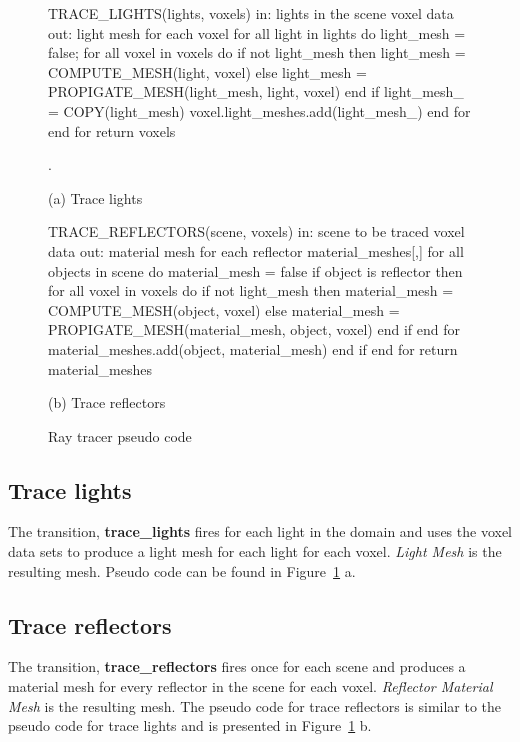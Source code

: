 \begin{figure}[!htb]
\begin{algorithm}
TRACE_LIGHTS(lights, voxels) 
  in:  lights in the scene
       voxel data
  out: light mesh for each voxel
  for all light in lights do
    light_mesh = false;
    for all voxel in voxels do 
      if not light_mesh then
        light_mesh = 
          COMPUTE_MESH(light, voxel)
      else
        light_mesh = 
          PROPIGATE_MESH(light_mesh, 
                       light, voxel)
      end if
      light_mesh_ = COPY(light_mesh)
      voxel.light_meshes.add(light_mesh_)
    end for
  end for
return voxels


.
\end{algorithm}

(a) Trace lights

\endminipage\hfill
{}
\begin{algorithm}
TRACE_REFLECTORS(scene, voxels) 
  in:  scene to be traced
       voxel data
  out: material mesh for each reflector
  material_meshes[,]
  for all objects in scene do
    material_mesh = false
    if object is reflector then
      for all voxel in voxels do 
        if not light_mesh then
          material_mesh = 
            COMPUTE_MESH(object, voxel)
        else
          material_mesh = 
            PROPIGATE_MESH(material_mesh, 
                         object, voxel)
        end if
      end for
      material_meshes.add(object, 
                         material_mesh)
    end if
  end for
return material_meshes
\end{algorithm}

(b) Trace reflectors

\endminipage\hfill
\caption{Ray tracer pseudo code}
\label{fig:ray_tracing_2}
\end{figure}

\subsection{Trace lights}
The transition, \textbf{trace\_lights} fires for each light in the domain and
uses the voxel data sets to produce a light mesh for each light for each
voxel.  \emph{Light Mesh} is the resulting mesh.  Pseudo code can be found in 
Figure~\ref{fig:ray_tracing_2} a.

\subsection{Trace reflectors}
The transition, \textbf{trace\_reflectors} fires once for each scene and 
produces a material mesh for every reflector in the scene for each voxel.  
\emph{Reflector Material Mesh} is the resulting mesh.  The pseudo code for trace 
reflectors is similar to the pseudo code for trace lights and is presented in
 Figure~\ref{fig:ray_tracing_2} b.

